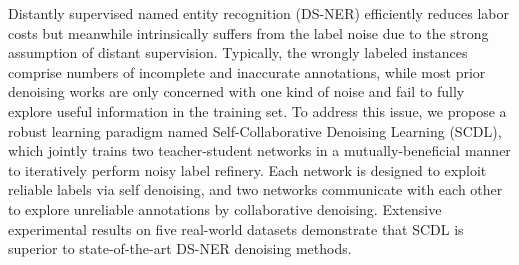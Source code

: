 Distantly supervised named entity recognition (DS-NER) efficiently reduces labor costs but meanwhile intrinsically suffers from the label noise due to the strong assumption of distant supervision. Typically, the wrongly labeled instances comprise numbers of incomplete and inaccurate annotations, while most prior denoising works are only concerned with one kind of noise and fail to fully explore useful information in the training set. To address this issue, we propose a robust learning paradigm named Self-Collaborative Denoising Learning (SCDL), which jointly trains two teacher-student networks in a mutually-beneficial manner to iteratively perform noisy label refinery. Each network is designed to exploit reliable labels via self denoising, and two networks communicate with each other to explore unreliable annotations by collaborative denoising. Extensive experimental results on five real-world datasets demonstrate that SCDL is superior to state-of-the-art DS-NER denoising methods.
